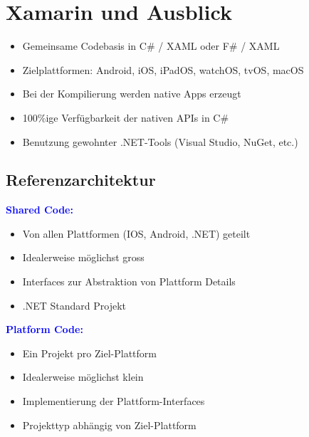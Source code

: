 
\section{Xamarin und Ausblick}
\begin{itemize}[topsep=0pt, leftmargin=4mm]
    \setlength\itemsep{-0.3em}
    \item Gemeinsame Codebasis in C\# / XAML oder F\# / XAML
    \item Zielplattformen: Android, iOS, iPadOS, watchOS, tvOS, macOS
    \item Bei der Kompilierung werden native Apps erzeugt
    \item 100\%ige Verfügbarkeit der nativen APIs in C\#
    \item Benutzung gewohnter .NET-Tools (Visual Studio, NuGet, etc.)
\end{itemize}
\subsection{Referenzarchitektur}
\textbf{\textcolor{blue}{Shared Code:}}
\begin{itemize}[topsep=0pt, leftmargin=4mm]
    \setlength\itemsep{-0.3em}
    \item Von allen Plattformen (IOS, Android, .NET) geteilt
    \item Idealerweise möglichst gross
    \item Interfaces zur Abstraktion von Plattform Details
    \item .NET Standard Projekt
\end{itemize}
\textbf{\textcolor{blue}{Platform Code:}}
\begin{itemize}[topsep=0pt, leftmargin=4mm]
    \setlength\itemsep{-0.3em}
    \item Ein Projekt pro Ziel-Plattform
    \item Idealerweise möglichst klein
    \item Implementierung der Plattform-Interfaces
    \item Projekttyp abhängig von Ziel-Plattform
\end{itemize}
